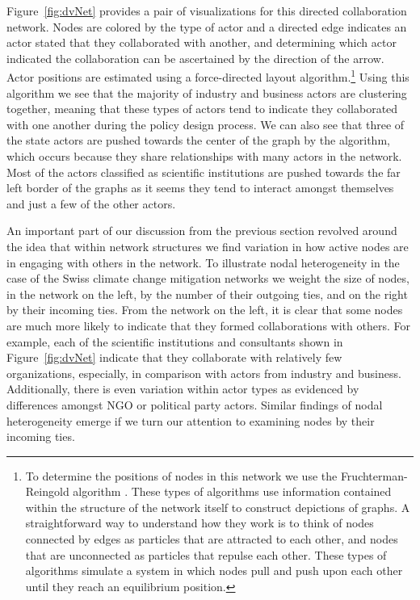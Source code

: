 \documentclass[12pt,onesided,pdflatex]{amsart}
\begin{document}
Figure~\ref{fig:dvNet} provides a pair of visualizations for this directed collaboration network. Nodes are colored by the type of actor and a directed edge indicates an actor stated that they collaborated with another, and determining which actor indicated the collaboration can be ascertained by the direction of the arrow. Actor positions are estimated using a force-directed layout algorithm.\footnote{To determine the positions of nodes in this network we use the Fruchterman-Reingold algorithm \citep{fruchterman:reingold:1991}. These types of algorithms use information contained within the structure of the network itself to construct depictions of graphs. A straightforward way to understand how they work is to think of nodes connected by edges as particles that are attracted to each other, and nodes that are unconnected as particles that repulse each other. These types of algorithms simulate a system in which nodes pull and push upon each other until they reach an equilibrium position.} Using this algorithm we see that the majority of industry and business actors are clustering together, meaning that these types of actors tend to indicate they collaborated with one another during the policy design process. We can also see that three of the state actors are pushed towards the center of the graph by the algorithm, which occurs because they share relationships with many actors in the network. Most of the actors classified as scientific institutions are pushed towards the far left border of the graphs as it seems they tend to interact amongst themselves and just a few of the other actors. 

An important part of our discussion from the previous section revolved around the idea that within network structures we find variation in how active nodes are in engaging with others in the network. To illustrate nodal heterogeneity in the case of the Swiss climate change mitigation networks we weight the size of nodes, in the network on the left, by the number of their outgoing ties, and on the right by their incoming ties. From the network on the left, it is clear that some nodes are much more likely to indicate that they formed collaborations with others. For example, each of the scientific institutions and consultants shown in Figure~\ref{fig:dvNet} indicate that they collaborate with relatively few organizations, especially, in comparison with actors from industry and business. Additionally, there is even variation within actor types as evidenced by differences amongst NGO or political party actors. Similar findings of nodal heterogeneity emerge if we turn our attention to examining nodes by their incoming ties. 
\end{document}
